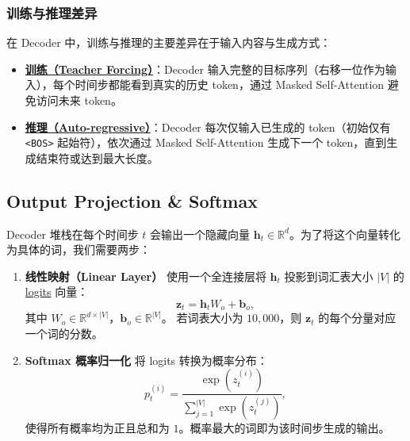 \subsubsection{训练与推理差异}

在 Decoder 中，训练与推理的主要差异在于输入内容与生成方式：
\begin{itemize}
  \item \hyperref[def:teacher-forcing]{\textbf{训练（Teacher Forcing）}}：Decoder 输入完整的目标序列（右移一位作为输入），每个时间步都能看到真实的历史 token，通过 Masked Self-Attention 避免访问未来 token。
  \item \hyperref[def:auto-regressive]{\textbf{推理（Auto-regressive）}}：Decoder 每次仅输入已生成的 token（初始仅有 \texttt{<BOS>} 起始符），依次通过 Masked Self-Attention 生成下一个 token，直到生成结束符或达到最大长度。
\end{itemize}



\clearpage
\subsection{Output Projection \& Softmax}

Decoder 堆栈在每个时间步 $t$ 会输出一个隐藏向量 $\mathbf{h}_t \in \mathbb{R}^d$。为了将这个向量转化为具体的词，我们需要两步：



\begin{enumerate}
  \item \textbf{线性映射（Linear Layer）}  
  使用一个全连接层将 $\mathbf{h}_t$ 投影到词汇表大小 $|V|$ 的 \hyperref[def:logits]{logits} 向量：
  \begin{equation}
  \mathbf{z}_t = \mathbf{h}_t W_o + \mathbf{b}_o,
  \end{equation}
  其中 $W_o \in \mathbb{R}^{d \times |V|}$，$\mathbf{b}_o \in \mathbb{R}^{|V|}$。  
  若词表大小为 $10{,}000$，则 $\mathbf{z}_t$ 的每个分量对应一个词的分数。
  
  \item \textbf{Softmax 概率归一化}  
  将 logits 转换为概率分布：
  \begin{equation}
  p_t^{(i)} = \frac{\exp(z_t^{(i)})}{\sum_{j=1}^{|V|} \exp(z_t^{(j)})},
  \end{equation}
  使得所有概率均为正且总和为 $1$。概率最大的词即为该时间步生成的输出。
\end{enumerate}

